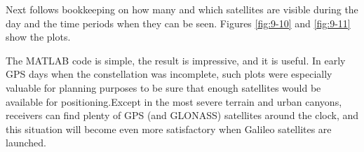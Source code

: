 		Next follows bookkeeping on how many and which satellites are visible during the day and the time periods when they can be seen. Figures \ref{fig:9-10} and \ref{fig:9-11} show the plots.
		
		The MATLAB code is simple, the result is impressive, and it is useful. In early GPS days when the constellation was incomplete, such plots were especially valuable for planning purposes to be sure that enough satellites would be available for positioning.Except in the most severe terrain and urban canyons, receivers can find plenty of GPS	(and GLONASS) satellites around the clock, and this situation will become even more satisfactory when Galileo satellites are launched.
	

	
	
